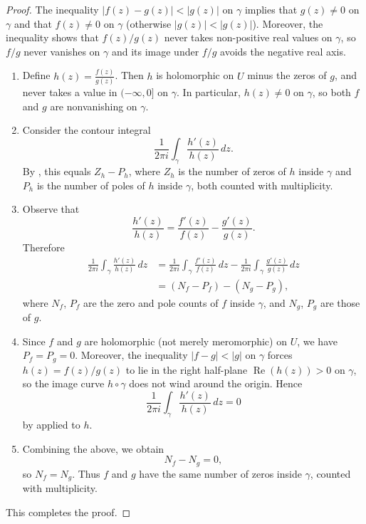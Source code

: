 \begin{proof}
    The inequality $|f(z) - g(z)| < |g(z)|$ on $\gamma$ implies that $g(z) \neq 0$ on $\gamma$ and that $f(z) \neq 0$ on $\gamma$ (otherwise $|g(z)| < |g(z)|$). Moreover, the inequality shows that $f(z)/g(z)$ never takes non-positive real values on $\gamma$, so $f/g$ never vanishes on $\gamma$ and its image under $f/g$ avoids the negative real axis.

    \begin{enumerate}
        \item Define $h(z) = \frac{f(z)}{g(z)}$. Then $h$ is holomorphic on $U$ minus the zeros of $g$, and never takes a value in $(-\infty, 0]$ on $\gamma$. In particular, $h(z) \neq 0$ on $\gamma$, so both $f$ and $g$ are nonvanishing on $\gamma$.

        \item Consider the contour integral
        $$\frac{1}{2\pi i} \int_{\gamma} \frac{h'(z)}{h(z)} \, dz.$$
        By , this equals $Z_h - P_h$, where $Z_h$ is the number of zeros of $h$ inside $\gamma$ and $P_h$ is the number of poles of $h$ inside $\gamma$, both counted with multiplicity.

        \item Observe that
        $$\frac{h'(z)}{h(z)} = \frac{f'(z)}{f(z)} - \frac{g'(z)}{g(z)}.$$
        Therefore
        \begin{align*}
        \frac{1}{2\pi i} \int_{\gamma} \frac{h'(z)}{h(z)} \, dz
        &= \frac{1}{2\pi i} \int_{\gamma} \frac{f'(z)}{f(z)} \, dz - \frac{1}{2\pi i} \int_{\gamma} \frac{g'(z)}{g(z)} \, dz \\
        &= (N_f - P_f) - (N_g - P_g),
        \end{align*}
        where $N_f$, $P_f$ are the zero and pole counts of $f$ inside $\gamma$, and $N_g$, $P_g$ are those of $g$.

        \item Since $f$ and $g$ are holomorphic (not merely meromorphic) on $U$, we have $P_f = P_g = 0$. Moreover, the inequality $|f - g| < |g|$ on $\gamma$ forces $h(z) = f(z)/g(z)$ to lie in the right half-plane $\operatorname{Re}(h(z)) > 0$ on $\gamma$, so the image curve $h \circ \gamma$ does not wind around the origin. Hence
        $$\frac{1}{2\pi i} \int_{\gamma} \frac{h'(z)}{h(z)} \, dz = 0$$
        by  applied to $h$.

        \item Combining the above, we obtain
        $$N_f - N_g = 0,$$
        so $N_f = N_g$. Thus $f$ and $g$ have the same number of zeros inside $\gamma$, counted with multiplicity.
    \end{enumerate}

    This completes the proof.
\end{proof}